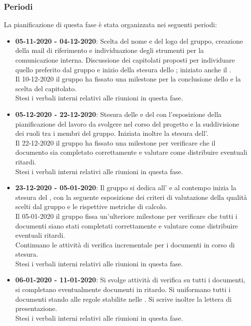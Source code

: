 \subsubsection{Periodi}
La pianificazione di questa fase è stata organizzata nei seguenti periodi:
\begin{itemize}
\item \textbf{05-11-2020 - 04-12-2020}: Scelta del nome e del logo del gruppo, creazione della mail di riferimento e individuazione degli strumenti per la comunicazione interna. Discussione dei capitolati proposti per individuare quello preferito dal gruppo e inizio della stesura dello \textit{\SdF{}} ; iniziato anche il \Glossario. \\Il 10-12-2020 il gruppo ha fissato una milestone\glo{} per la conclusione dello \textit{\SdF{}} e la scelta del capitolato.\\Stesi i verbali interni relativi alle riunioni in questa fase.
\item \textbf{05-12-2020 - 22-12-2020}: Stesura delle \textit{\NdP{}} e del \textit{\PdP{}} con l'esposizione della pianificazione del lavoro da svolgere nel corso del progetto e la suddivisione dei ruoli tra i membri del gruppo. Iniziata inoltre la stesura dell'\textit{\AdR{}}.\\Il 22-12-2020 il gruppo ha fissato una milestone per verificare che il documento \textit{\NdP{}} sia completato correttamente e valutare come distribuire eventuali ritardi.\\Stesi i verbali interni relativi alle riunioni in questa fase.
\item \textbf{23-12-2020 - 05-01-2020}: Il gruppo si dedica all'\textit{\AdR{}} e al contempo inizia la stesura del \textit{\PdQ{}}, con la seguente esposizione dei criteri di valutazione della qualità scelti dal gruppo e le rispettive metriche\glo{} di calcolo.\\Il 05-01-2020 il gruppo fissa un'ulteriore milestone per verificare che tutti i documenti siano stati completati correttamente e valutare come distribuire eventuali ritardi.\\Continuano le attività di verifica incrementale per i documenti in corso di stesura.\\Stesi i verbali interni relativi alle riunioni in questa fase.
\item \textbf{06-01-2020 - 11-01-2020}: Si svolge attività di verifica su tutti i documenti, si completano eventualmente documenti in ritardo. Si uniformano tutti i documenti stando alle regole stabilite nelle \textit{\NdP{}}. Si scrive inoltre la lettera di presentazione.\\Stesi i verbali interni relativi alle riunioni in questa fase.
\end{itemize}

